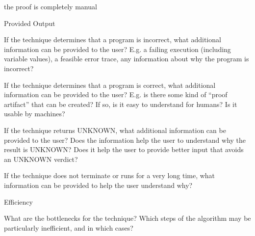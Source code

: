 \documentclass[a4paper]{article}
\begin{document}
\begin{minipage}[t]{0.16\linewidth}
\begin{betterlist}
\begin{betterlist}
			\item \checkboxUnchecked the proof is completely manual
		\end{betterlist}
		\item \alert{Provided Output}
		\begin{betterlist}
			\item If the technique determines that a program is incorrect, what additional information can be provided to the user? E.g. a failing execution (including variable values), a feasible error trace, any information about why the program is incorrect?

			\item If the technique determines that a program is correct, what additional information can be provided to the user? E.g. is there some kind of \enquote{proof artifact} that can be created? If so, is it easy to understand for humans? Is it usable by machines?

			\item If the technique returns UNKNOWN, what additional information can be provided to the user? Does the information help the user to understand why the result is UNKNOWN? Does it help the user to provide better input that avoids an UNKNOWN verdict?

			\item If the technique does not terminate or runs for a very long time, what information can be provided to help the user understand why?

		\end{betterlist}
		\item \alert{Efficiency}
		\begin{betterlist}
			\item What are the bottlenecks for the technique? Which steps of the algorithm may be particularly inefficient, and in which cases?


\end{betterlist}
\end{betterlist}
\end{minipage}
\end{document}
